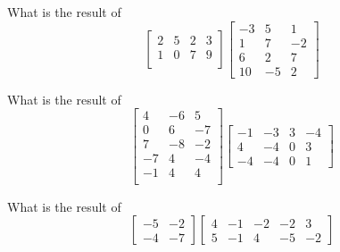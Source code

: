 \bexo
What is the result of 
\begin{equation*}
\left[
\begin{array}{cccc}
2 & 5 & 2 & 3\\
1 & 0 & 7 & 9\\
\end{array}
\right]
\left[
\begin{array}{ccc}
-3 & 5 &1\\
1 & 7 &-2\\
6 & 2 & 7\\
10 & -5&2
\end{array}
\right]
\end{equation*}

\eexo
{}

\bexo
What is the result of 
\begin{equation*}
\left[
\begin{array}{ccc}
     4   & -6 &    5\\
     0  &   6 &   -7\\
     7  &  -8 &   -2\\
    -7  &   4 &   -4\\
    -1  &   4 &    4\\
\end{array}
\right]
\left[
\begin{array}{cccc}
    -1 &   -3 &    3 &   -4\\
     4 &   -4 &   0   &  3\\
    -4 &   -4 &    0   &  1
\end{array}
\right]
\end{equation*}

\eexo
{}
\bexo
What is the result of 
\begin{equation*}
\left[
\begin{array}{cc}
    -5   & -2\\
    -4   & -7
\end{array}
\right]
\left[
\begin{array}{ccccc}
     4  &  -1  &  -2  &  -2  &   3\\
     5  &  -1  &   4  &  -5  &  -2
\end{array}
\right]
\end{equation*}

